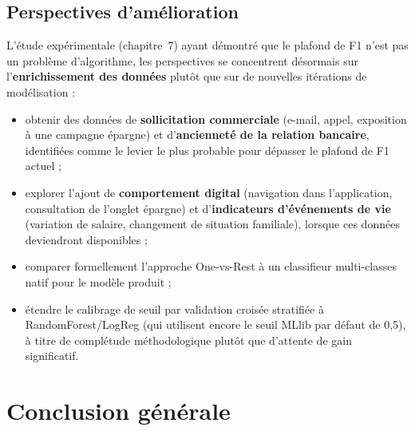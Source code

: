 \documentclass[11pt,a4paper]{report}
\begin{document}
\section{Perspectives d'amélioration}
\statutEnCours{}
L'étude expérimentale (chapitre~7) ayant démontré que le plafond de F1
n'est pas un problème d'algorithme, les perspectives se concentrent
désormais sur l'\textbf{enrichissement des données} plutôt que sur de
nouvelles itérations de modélisation :
\begin{itemize}
  \item obtenir des données de \textbf{sollicitation commerciale} (e-mail,
  appel, exposition à une campagne épargne) et d'\textbf{ancienneté de la
  relation bancaire}, identifiées comme le levier le plus probable pour
  dépasser le plafond de F1 actuel ;
  \item explorer l'ajout de \textbf{comportement digital} (navigation dans
  l'application, consultation de l'onglet épargne) et d'\textbf{indicateurs
  d'événements de vie} (variation de salaire, changement de situation
  familiale), lorsque ces données deviendront disponibles ;
  \item comparer formellement l'approche One-vs-Rest à un classifieur
  multi-classes natif pour le modèle produit ;
  \item étendre le calibrage de seuil par validation croisée stratifiée à
  RandomForest/LogReg (qui utilisent encore le seuil MLlib par défaut de
  0,5), à titre de complétude méthodologique plutôt que d'attente de gain
  significatif.
\end{itemize}


\chapter{Conclusion générale}


\appendix
\end{document}
